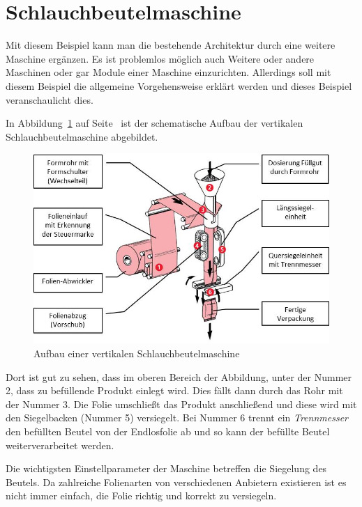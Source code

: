 \section{Schlauchbeutelmaschine}
Mit diesem Beispiel kann man die bestehende Architektur durch eine weitere Maschine ergänzen. Es ist problemlos möglich
auch Weitere oder andere Maschinen oder gar Module einer Maschine einzurichten. Allerdings soll mit diesem Beispiel die
allgemeine Vorgehensweise erklärt werden und dieses Beispiel veranschaulicht dies.

In Abbildung~\ref{fig:siegelmaschinen_vffs} auf Seite~\pageref{fig:siegelmaschinen_vffs} ist der schematische Aufbau der
vertikalen Schlauchbeutelmaschine abgebildet.

\begin{figure}[h]
    \centering
    \includegraphics[scale=1]{images/kapitel_5/vffs.jpg}
    \caption{Aufbau einer vertikalen Schlauchbeutelmaschine~\cite{online_grundlagen_boschkwe}}
    \label{fig:siegelmaschinen_vffs}
\end{figure}

Dort ist gut zu sehen, dass im oberen Bereich der Abbildung, unter der Nummer 2, dass zu befüllende Produkt einlegt
wird. Dies fällt dann durch das Rohr mit der Nummer 3. Die Folie umschließt das Produkt anschließend und diese wird mit
den Siegelbacken (Nummer 5) versiegelt. Bei Nummer 6 trennt ein \textit{Trennmesser} den befüllten Beutel von der
Endlosfolie ab und so kann der befüllte Beutel weiterverarbeitet werden.

Die wichtigsten Einstellparameter der Maschine betreffen die Siegelung des Beutels. Da zahlreiche Folienarten von
verschiedenen Anbietern existieren ist es nicht immer einfach, die Folie richtig und korrekt zu versiegeln.

